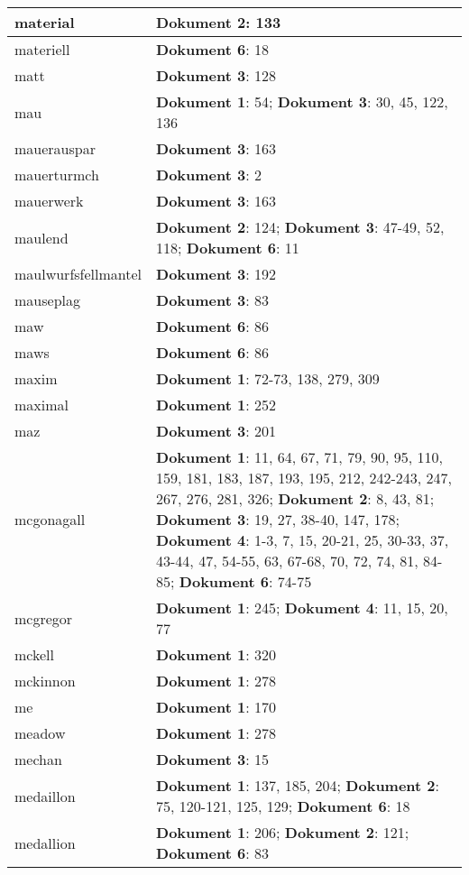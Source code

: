 \documentclass[a5paper]{article}
\begin{document}
\begin{longtable}[l]{|l|p{3in}|}
\hline
material & \textbf{Dokument 2}: 133 \\
\hline
materiell & \textbf{Dokument 6}: 18 \\
\hline
matt & \textbf{Dokument 3}: 128 \\
\hline
mau & \textbf{Dokument 1}: 54; \textbf{Dokument 3}: 30, 45, 122, 136 \\
\hline
mauerauspar & \textbf{Dokument 3}: 163 \\
\hline
mauerturmch & \textbf{Dokument 3}: 2 \\
\hline
mauerwerk & \textbf{Dokument 3}: 163 \\
\hline
maulend & \textbf{Dokument 2}: 124; \textbf{Dokument 3}: 47-49, 52, 118; \textbf{Dokument 6}: 11 \\
\hline
maulwurfsfellmantel & \textbf{Dokument 3}: 192 \\
\hline
mauseplag & \textbf{Dokument 3}: 83 \\
\hline
maw & \textbf{Dokument 6}: 86 \\
\hline
maws & \textbf{Dokument 6}: 86 \\
\hline
maxim & \textbf{Dokument 1}: 72-73, 138, 279, 309 \\
\hline
maximal & \textbf{Dokument 1}: 252 \\
\hline
maz & \textbf{Dokument 3}: 201 \\
\hline
mcgonagall & \textbf{Dokument 1}: 11, 64, 67, 71, 79, 90, 95, 110, 159, 181, 183, 187, 193, 195, 212, 242-243, 247, 267, 276, 281, 326; \textbf{Dokument 2}: 8, 43, 81; \textbf{Dokument 3}: 19, 27, 38-40, 147, 178; \textbf{Dokument 4}: 1-3, 7, 15, 20-21, 25, 30-33, 37, 43-44, 47, 54-55, 63, 67-68, 70, 72, 74, 81, 84-85; \textbf{Dokument 6}: 74-75 \\
\hline
mcgregor & \textbf{Dokument 1}: 245; \textbf{Dokument 4}: 11, 15, 20, 77 \\
\hline
mckell & \textbf{Dokument 1}: 320 \\
\hline
mckinnon & \textbf{Dokument 1}: 278 \\
\hline
me & \textbf{Dokument 1}: 170 \\
\hline
meadow & \textbf{Dokument 1}: 278 \\
\hline
mechan & \textbf{Dokument 3}: 15 \\
\hline
medaillon & \textbf{Dokument 1}: 137, 185, 204; \textbf{Dokument 2}: 75, 120-121, 125, 129; \textbf{Dokument 6}: 18 \\
\hline
medallion & \textbf{Dokument 1}: 206; \textbf{Dokument 2}: 121; \textbf{Dokument 6}: 83 \\

\end{longtable}
\end{document}
